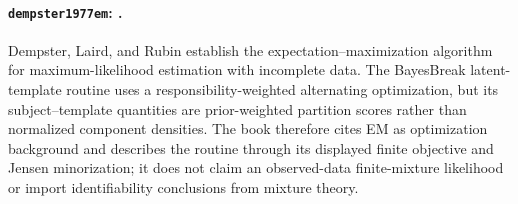 \paragraph{\texttt{dempster1977em}: \citet{dempster1977em}.}
Dempster, Laird, and Rubin establish the expectation--maximization algorithm for maximum-likelihood estimation with incomplete data. The BayesBreak latent-template routine uses a responsibility-weighted alternating optimization, but its subject--template quantities are prior-weighted partition scores rather than normalized component densities. The book therefore cites EM as optimization background and describes the routine through its displayed finite objective and Jensen minorization; it does not claim an observed-data finite-mixture likelihood or import identifiability conclusions from mixture theory.
